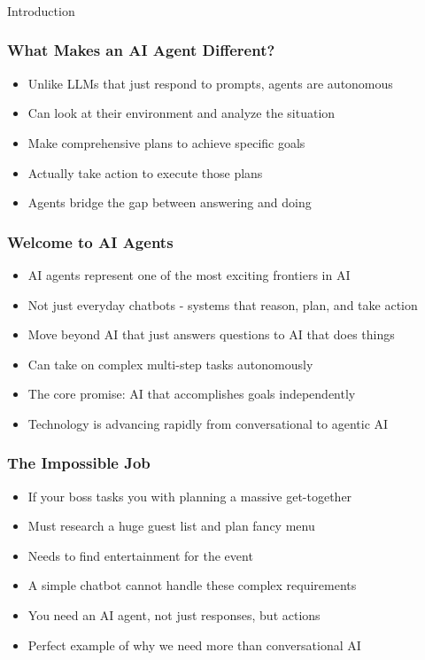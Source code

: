 \begin{frame}[fragile]\frametitle{}
\begin{center}
{\Large Introduction}
\end{center}
\end{frame}

\begin{frame}[fragile]\frametitle{What Makes an AI Agent Different?}
      \begin{itemize}
        \item Unlike LLMs that just respond to prompts, agents are autonomous
        \item Can look at their environment and analyze the situation
        \item Make comprehensive plans to achieve specific goals
        \item Actually take action to execute those plans
        \item Agents bridge the gap between answering and doing
      \end{itemize}
\end{frame}

\begin{frame}[fragile]\frametitle{Welcome to AI Agents}
      \begin{itemize}
        \item AI agents represent one of the most exciting frontiers in AI
        \item Not just everyday chatbots - systems that reason, plan, and take action
        \item Move beyond AI that just answers questions to AI that does things
        \item Can take on complex multi-step tasks autonomously
        \item The core promise: AI that accomplishes goals independently
        \item Technology is advancing rapidly from conversational to agentic AI
      \end{itemize}
\end{frame}


\begin{frame}[fragile]\frametitle{The Impossible Job}
      \begin{itemize}
        \item If your boss tasks you with planning a massive get-together
        \item Must research a huge guest list and plan fancy menu
        \item Needs to find entertainment for the event
        \item A simple chatbot cannot handle these complex requirements
        \item You need an AI agent, not just responses, but actions
        \item Perfect example of why we need more than conversational AI
      \end{itemize}
\end{frame}


